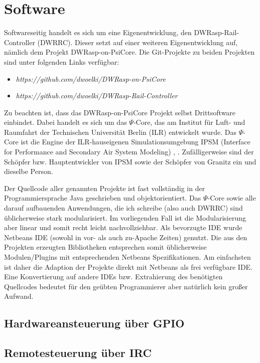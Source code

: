 \section{Software}
\label{sec:software}

Softwareseitig handelt es sich um eine Eigenentwicklung, den DWRasp-Rail-Controller (DWRRC).
Dieser setzt auf einer weiteren Eigenentwicklung auf, n\"amlich dem Projekt DWRasp-on-PsiCore.
Die Git-Projekte zu beiden Projekten sind unter folgenden Links verf\"ugbar:
\begin{itemize}
	\item \textit{https://github.com/dwoelki/DWRasp-on-PsiCore}
	\item \textit{https://github.com/dwoelki/DWRasp-Rail-Controller}
\end{itemize}
Zu beachten ist, dass das DWRasp-on-PsiCore Projekt selbst Drittsoftware einbindet.
Dabei handelt es sich um das $\Psi$-Core, das am Institut f\"ur Luft- und Raumfahrt der Technischen Universit\"at Berlin (ILR) entwickelt wurde.
Das $\Psi$-Core ist die Engine der ILR-hauseigenen Simulationsumgebung IPSM (Interface for Performance and Secondary Air System Modeling) \cite{Woe14}, \cite{Woe19c}.
Zuf\"alligerweise sind der Sch\"opfer bzw. Hauptentwickler von IPSM sowie der Sch\"opfer von Granitz ein und dieselbe Person.

Der Quellcode aller genannten Projekte ist fast vollst\"andig in der Programmiersprache Java geschrieben und objektorientiert.
Das $\Psi$-Core sowie alle darauf aufbauenden Anwendungen, die ich schreibe (also auch DWRRC) sind \"ublicherweise stark modularisiert.
Im vorliegenden Fall ist die Modularisierung aber linear und somit recht leicht nachvollziehbar.
Als bevorzugte IDE wurde Netbeans IDE (sowohl in vor- als auch zu-Apache Zeiten) genutzt.
Die aus den Projekten erzeugten Bibliotheken entsprechen somit \"ublicherweise Modulen/Plugins mit entsprechenden Netbeans Spezifikationen.
Am einfachsten ist daher die Adaption der Projekte direkt mit Netbeans als frei verf\"ugbare IDE.
Eine Konvertierung auf andere IDEs bzw. Extrahierung des ben\"otigten Quellcodes bedeutet f\"ur den ge\"ubten Programmierer aber nat\"urlich kein gro{\ss}er Aufwand.





\subsection{Hardwareansteuerung \"uber GPIO}
\label{sec:gpio}



\subsection{Remotesteuerung \"uber IRC}
\label{sec:remote_irc}